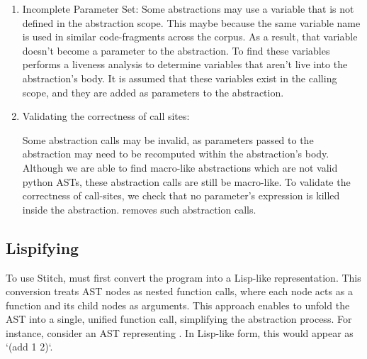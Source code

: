 \begin{enumerate}
    \item Incomplete Parameter Set:
    Some abstractions may use a variable that is not defined in the abstraction scope. This maybe because the same variable name is used in similar code-fragments across the corpus. As a result, that variable doesn't become a parameter to the abstraction.  
    To find these variables \toolname performs a liveness analysis to determine variables that aren't live into the abstraction's body. It is assumed that these variables exist in the calling scope, and they are added as parameters to the abstraction.

    \item Validating the correctness of call sites:

    Some abstraction calls may be invalid, as parameters passed to the abstraction may need to be recomputed within the abstraction's body. 
    Although we are able to find macro-like abstractions which are not valid python ASTs, these abstraction calls are still be macro-like.
    To validate the correctness of call-sites, we check that no parameter's expression is killed inside the abstraction. \toolname removes such abstraction calls.

\end{enumerate}








\subsection{Lispifying}
To use Stitch, \toolname must first convert the \ptwo{} program into a Lisp-like representation. 
This conversion treats AST nodes as nested function calls, where each node acts as a function and its child nodes as arguments. This approach enables \toolname to unfold the AST into a single, unified function call, simplifying the abstraction process. For instance, consider an AST representing . In Lisp-like form, this would appear as `(add 1 2)`. 


